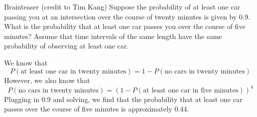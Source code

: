 \documentclass[11pt]{article}
\begin{document}
\begin{exercise}{Brainteaser (credit to Tim Kang)}
Suppose the probability of at least one car passing you at an intersection over the course of twenty minutes is given by 0.9. What is the probability that at least one car passes you over the course of five minutes? Assume that time intervals of the same length have the same probability of observing at least one car. 
\end{exercise}

\begin{solution}{2}
We know that 
    $$P(\text{at least one car in twenty minutes}) = 1 - P(\text{no cars in twenty minutes})$$ 
However, we also know that 
    $$P(\text{no cars in twenty minutes}) = (1-P(\text{at least one car in 
     five minutes}))^4$$
Plugging in 0.9 and solving, we find that the probability that at least one car passes over the course of five minutes is approximately 0.44.      
\end{solution}
\end{document}
